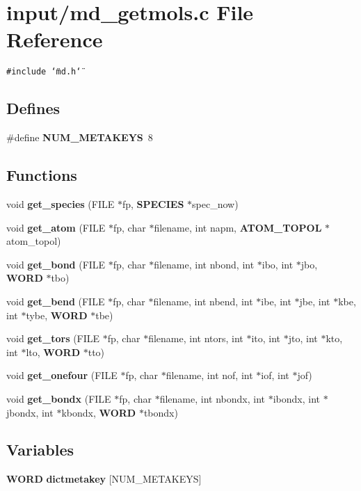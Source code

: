 \section{input/md\_\-getmols.c File Reference}
\label{md__getmols_8c}
{\tt \#include \char`\"{}md.h\char`\"{}}\par
\subsection*{Defines}
\begin{CompactItemize}
\item 
\#define {\bf NUM\_\-METAKEYS}~8
\end{CompactItemize}
\subsection*{Functions}
\begin{CompactItemize}
\item 
void {\bf get\_\-species} (FILE $\ast$fp, {\bf SPECIES} $\ast$spec\_\-now)
\item 
void {\bf get\_\-atom} (FILE $\ast$fp, char $\ast$filename, int napm, {\bf ATOM\_\-TOPOL} $\ast$atom\_\-topol)
\item 
void {\bf get\_\-bond} (FILE $\ast$fp, char $\ast$filename, int nbond, int $\ast$ibo, int $\ast$jbo, {\bf WORD} $\ast$tbo)
\item 
void {\bf get\_\-bend} (FILE $\ast$fp, char $\ast$filename, int nbend, int $\ast$ibe, int $\ast$jbe, int $\ast$kbe, int $\ast$tybe, {\bf WORD} $\ast$tbe)
\item 
void {\bf get\_\-tors} (FILE $\ast$fp, char $\ast$filename, int ntors, int $\ast$ito, int $\ast$jto, int $\ast$kto, int $\ast$lto, {\bf WORD} $\ast$tto)
\item 
void {\bf get\_\-onefour} (FILE $\ast$fp, char $\ast$filename, int nof, int $\ast$iof, int $\ast$jof)
\item 
void {\bf get\_\-bondx} (FILE $\ast$fp, char $\ast$filename, int nbondx, int $\ast$ibondx, int $\ast$jbondx, int $\ast$kbondx, {\bf WORD} $\ast$tbondx)
\end{CompactItemize}
\subsection*{Variables}
\begin{CompactItemize}
\item 
{\bf WORD} {\bf dictmetakey} [NUM\_\-METAKEYS]
\end{CompactItemize}



